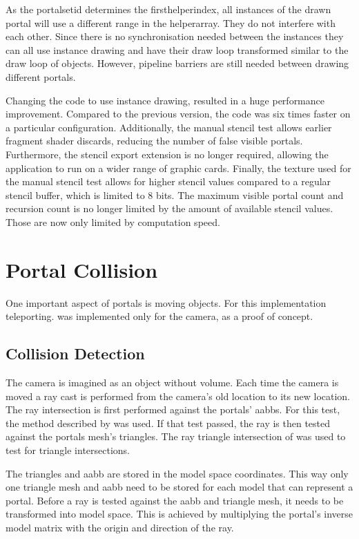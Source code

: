 As the \gls{portalsetid} determines the \gls{firsthelperindex}, all instances of the drawn portal will use a different range in the \gls{helperarray}. They do not interfere with each other. Since there is no synchronisation needed between the instances they can all use instance drawing and have their draw loop transformed similar to the draw loop of objects. However, pipeline barriers are still needed between drawing different portals.

Changing the code to use instance drawing, resulted in a huge performance improvement. Compared to the previous version, the code was six times faster on a particular configuration. Additionally, the manual stencil test allows earlier fragment shader discards, reducing the number of false visible portals. Furthermore, the stencil export extension is no longer required, allowing the application to run on a wider range of graphic cards. Finally, the texture used for the manual stencil test allows for higher stencil values compared to a regular stencil buffer, which is limited to 8 bits. The maximum visible portal count and recursion count is no longer limited by the amount of available stencil values. Those are now only limited by computation speed.


\section{Portal Collision}
One important aspect of portals is moving objects. For this implementation teleporting. was implemented only for the camera, as a proof of concept.

\subsection{Collision Detection}
The camera is imagined as an object without volume. Each time the camera is moved a ray cast is performed from the camera's old location to its new location. The ray intersection is first performed against the portals' \glspl{aabb}. For this test, the method described by \textcite{williams:2005:efficient} was used. If that test passed, the ray is then tested against the portals mesh's triangles. The ray triangle intersection of \textcite{moller:2005:fast} was used to test for triangle intersections.


The triangles and \gls{aabb} are stored in the model space coordinates. This way only one triangle mesh and \gls{aabb} need to be stored for each model that can represent a portal. Before a ray is tested against the \gls{aabb} and triangle mesh, it needs to be transformed into model space. This is achieved by multiplying the portal's inverse model matrix with the origin and direction of the ray.

